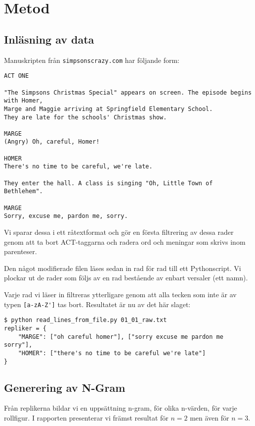 \documentclass[a4paper]{article}
\begin{document}
\section{Metod}

\subsection{Inläsning av data}
Manuskripten från \nolinkurl{simpsonscrazy.com} har följande form:
\begin{verbatim}
ACT ONE

"The Simpsons Christmas Special" appears on screen. The episode begins with Homer,
Marge and Maggie arriving at Springfield Elementary School.
They are late for the schools' Christmas show.

MARGE
(Angry) Oh, careful, Homer!

HOMER
There's no time to be careful, we're late.

They enter the hall. A class is singing "Oh, Little Town of Bethlehem".

MARGE
Sorry, excuse me, pardon me, sorry.
\end{verbatim}

Vi sparar dessa i ett råtextformat och gör en första filtrering av
dessa rader genom att ta bort ACT-taggarna och radera ord och meningar
som skrivs inom parenteser.

Den något modifierade filen läses sedan in rad för rad till ett
Pythonscript. Vi plockar ut de rader som följs av en rad bestående av
enbart versaler (ett namn).

Varje rad vi läser in filtreras ytterligare genom att alla tecken som
inte är av typen \verb=[a-zA-Z']= tas bort. Resultatet är nu av det
här slaget:

\begin{verbatim}
$ python read_lines_from_file.py 01_01_raw.txt
repliker = {
    "MARGE": ["oh careful homer"], ["sorry excuse me pardon me sorry"],
    "HOMER": ["there's no time to be careful we're late"]
}
\end{verbatim}

\subsection{Generering av N-Gram}
Från replikerna bildar vi en uppsättning n-gram, för olika n-värden,
för varje rollfigur. I rapporten presenterar vi främst resultat för
$n=2$ men även för $n=3$.
\end{document}
